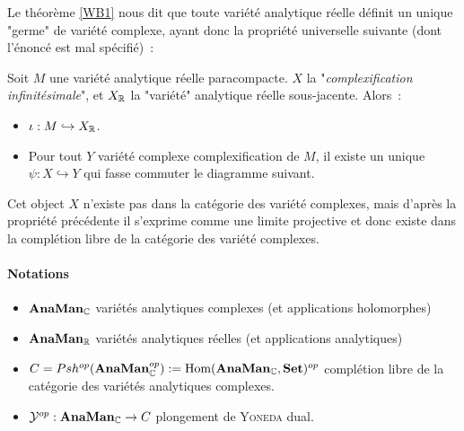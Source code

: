 \documentclass[a4paper]{article}
\begin{document}
Le théorème \ref{WB1} nous dit que toute variété analytique réelle définit un unique "germe" de variété complexe, ayant donc la propriété universelle suivante (dont l'énoncé est mal spécifié)~:
\begin{prop}
Soit $M$ une variété analytique réelle paracompacte. $X$ la "\textit{complexification infinitésimale}", et $X_{\mathbb{R}}$ la "variété" analytique réelle sous-jacente. Alors~:
\begin{itemize}
\item $\iota : M \hookrightarrow X_{\mathbb{R}}$.
\item Pour tout $Y$ variété complexe complexification de $M$, il existe un unique $\psi : X \hookrightarrow Y$ qui fasse commuter le diagramme suivant.
\end{itemize}
\begin{center}\end{center}
\end{prop}

Cet object $X$ n'existe pas dans la catégorie des variété complexes, mais d'après la propriété précédente il s'exprime comme une limite projective et donc existe dans la complétion libre de la catégorie des variété complexes.

\paragraph{Notations}
\begin{itemize}
\item $\textbf{AnaMan}_{\mathbb{C}}$ variétés analytiques complexes (et applications holomorphes)
\item $\textbf{AnaMan}_{\mathbb{R}}$ variétés analytiques réelles (et applications analytiques)
\item $C= Psh^{op}(\textbf{AnaMan}_{\mathbb{C}}^{op}):= \text{Hom}(\textbf{AnaMan}_{\mathbb{C}},\textbf{Set})^{op}$ complétion libre de la catégorie des variétés analytiques complexes.
\item $\mathcal{Y}^{op} : \textbf{AnaMan}_{\mathbb{C}} \rightarrow C$ plongement de \textsc{Yoneda} dual.
\end{itemize}
\end{document}
